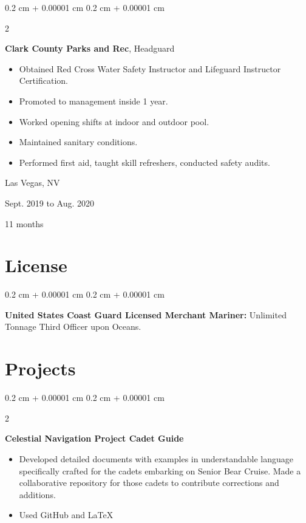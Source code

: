 \documentclass[10pt, letterpaper]{article}
\newenvironment{highlights}{
    \begin{itemize}[
        topsep=0.10 cm,
        parsep=0.10 cm,
        partopsep=0pt,
        itemsep=0pt,
        leftmargin=0.4 cm + 10pt
    ]
}{
    \end{itemize}
} %
\newenvironment{onecolentry}{
    \begin{adjustwidth}{
        0.2 cm + 0.00001 cm
    }{
        0.2 cm + 0.00001 cm
    }
}{
    \end{adjustwidth}
} %
\newenvironment{twocolentry}[2][]{
    \onecolentry
    \def\secondColumn{#2}
    \setcolumnwidth{\fill, 4.5 cm}
    \begin{paracol}{2}
}{
    \switchcolumn \raggedleft \secondColumn
    \end{paracol}
    \endonecolentry
} %
\begin{document}
        \begin{twocolentry}{
            Las Vegas, NV

        Sept. 2019 to Aug. 2020

        11 months
        }
            \textbf{Clark County Parks and Rec}, Headguard
            \begin{highlights}
                \item Obtained Red Cross Water Safety Instructor and Lifeguard Instructor Certification.
                \item Promoted to management inside 1 year.
                \item Worked opening shifts at indoor and outdoor pool.
                \item Maintained sanitary conditions.
                \item Performed first aid, taught skill refreshers, conducted safety audits.
            \end{highlights}
        \end{twocolentry}



    
    \section{License}



        
        \begin{onecolentry}
            \textbf{United States Coast Guard Licensed Merchant Mariner:} Unlimited Tonnage Third Officer upon Oceans.
        \end{onecolentry}


    
    \section{Projects}



        
        \begin{twocolentry}{
            2024
        }
            \textbf{Celestial Navigation Project Cadet Guide}
            \begin{highlights}
                \item Developed detailed documents with examples in understandable language specifically crafted for the cadets embarking on Senior Bear Cruise. Made a collaborative repository for those cadets to contribute corrections and additions.
                \item Used GitHub and \LaTeX
            \end{highlights}
        \end{twocolentry}
\end{document}

